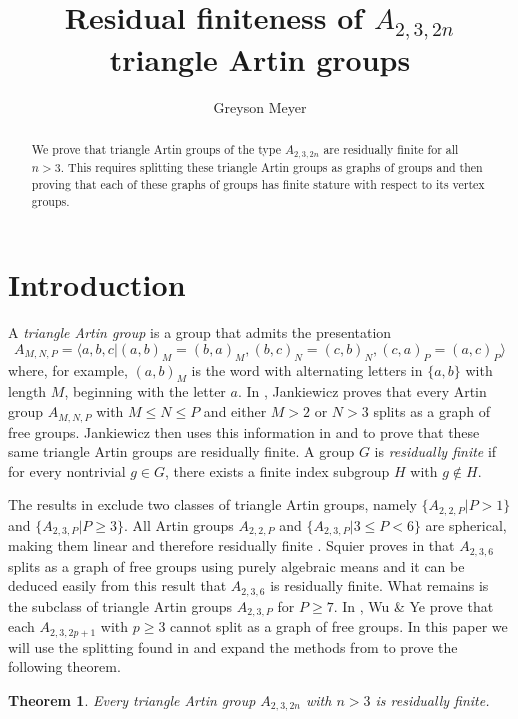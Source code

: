 \documentclass[11pt,hyp,]{nyjm}
\title{Residual finiteness of $A_{2,3,2n}$ triangle Artin groups}
\author{Greyson Meyer}
\newtheorem{theorem}{Theorem}[section]
\theoremstyle{definition}
\begin{document}
 
 
\begin{abstract}
    We prove that triangle Artin groups of the type $A_{2,3,2n}$ are residually finite for all $n>3$. This requires splitting these triangle Artin groups as graphs of groups and then proving that each of these graphs of groups has finite stature with respect to its vertex groups.
\end{abstract}
\maketitle
\tableofcontents

\section{Introduction}
A \emph{triangle Artin group} is a group that admits the presentation \[A_{M,N,P}=\langle a,b,c|(a,b)_M=(b,a)_M,(b,c)_N=(c,b)_N,(c,a)_P=(a,c)_P\rangle\] where, for example, $(a,b)_M$ is the word with alternating letters in $\{ a,b\}$ with length $M$, beginning with the letter $a$. In \cite{jankiewicz2021splittings}, Jankiewicz proves that every Artin group $A_{M,N,P}$ with $M\leq N\leq P$ and either $M>2$ or $N>3$ splits as a graph of free groups. Jankiewicz then uses this information in \cite{jankiewicz2022residual} and \cite{jankiewicz2023finite} to prove that these same triangle Artin groups are residually finite. A group $G$ is \emph{residually finite} if for every nontrivial $g\in G$, there exists a finite index subgroup $H$ with $g\notin H$. 

The results in \cite{jankiewicz2023finite} exclude two classes of triangle Artin groups, namely $\{A_{2,2,P}|P>1\}$ and $\{A_{2,3,P}|P\geq3\}$. All Artin groups $A_{2,2,P}$ and $\{A_{2,3,P}|3\leq P<6\}$ are spherical, making them linear \cite{cohen2000linearityartingroupsfinite,DIGNE200339} and therefore residually finite \cite{Mal40}. Squier proves in \cite{f4627749-cce2-3922-b300-7d6c84e2c583} that $A_{2,3,6}$ splits as a graph of free groups using purely algebraic means and it can be deduced easily from this result that $A_{2,3,6}$ is residually finite. What remains is the subclass of triangle Artin groups $A_{2,3,P}$ for $P\geq7$. In \cite{wu2023splittings}, Wu \& Ye prove that each $A_{2,3,2p+1}$ with $p\geq3$ cannot split as a graph of free groups. In this paper we will use the splitting found in \cite{wu2023splittings} and expand the methods from \cite{jankiewicz2023finite} to prove the following theorem.
\begin{theorem}
    Every triangle Artin group $A_{2,3,2n}$ with $n>3$ is residually finite.
\end{theorem}
\end{document}

